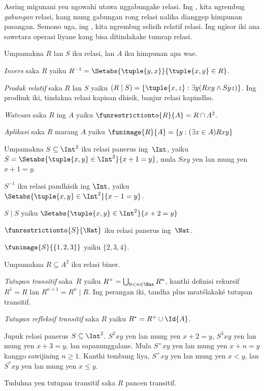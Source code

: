 \documentclass[../../../include/open-logic-section]{subfiles}
\begin{document}

Asring migunani yen ngowahi utawa nggabungake relasi.
Ing ,
kita ngrembug \emph{gabungan} relasi, kang mung
gabungan rong relasi nalika dianggep himpunan pasangan.
Semono uga, ing ,
kita ngrembug selisih relatif relasi.
Ing ngisor iki ana sawetara operasi liyane
kang bisa ditindakake tumrap relasi.

\begin{defn}
Umpamakna $R$ lan $S$ iku relasi, lan $A$ iku himpunan apa wae.

\emph{Invers} saka $R$ yaiku
$R^{-1} = \Setabs{\tuple{y, x}}{\tuple{x,y} \in R}$.

\emph{Produk relatif} saka $R$ lan $S$ yaiku
$(R \mid S) =\{\tuple{x, z} : \exists y(Rxy \land Syz)\}$.
Ing prodhuk iki, tindakna relasi kapisan dhisik, banjur relasi kapindho.

\emph{Watesan} saka $R$ ing $A$ yaiku
$\funrestrictionto{R}{A}= R\cap A^2$.

\emph{Aplikasi} saka $R$ marang $A$ yaiku
$\funimage{R}{A} = \{y :( \exists x \in A)Rxy\}$
\end{defn}

\begin{ex}
Umpamakna $S \subseteq \Int^2$ iku relasi panerus
ing~$\Int$, yaiku
$S = \Setabs{\tuple{x, y} \in \Int^2}{x + 1 = y}$,
mula $Sxy$ yen lan mung yen $x + 1 = y$.

$S^{-1}$ iku relasi pandhisik ing $\Int$, yaiku
$\Setabs{\tuple{x,y}\in\Int^2}{x -1 =y}$.

$S\mid S$ yaiku
$ \Setabs{\tuple{x,y}\in\Int^2}{x + 2 =y}$

$\funrestrictionto{S}{\Nat}$ iku relasi panerus ing~$\Nat$.

$\funimage{S}{\{1,2,3\}}$ yaiku $\{2, 3, 4\}$.
\end{ex}

\begin{defn}Umpamakna $R \subseteq A^2$ iku relasi biner.

\emph{Tutupan transitif} saka~$R$ yaiku
$R^+ = \bigcup_{0 < n \in\Nat} R^n$,
kanthi definisi rekursif $R^1 = R$ lan
$R^{n+1} = R^n\mid R$.
Ing perangan iki, tandha plus mratélakaké tutupan transitif.

\emph{Tutupan refleksif transitif} saka $R$ yaiku
$R^* = R^+ \cup\Id{A}$.
\end{defn}

\begin{ex}
Jupuk relasi panerus $S \subseteq \Int^2$.
$S^2xy$ yen lan mung yen $x + 2 =y$,
$S^3xy$ yen lan mung yen $x + 3 = y$,
lan sapanunggalane.
Mula $S^+xy$ yen lan mung yen $x + n = y$
kanggo sawijining $n \geq 1$.
Kanthi tembung liya, $S^+xy$ yen lan mung yen
$x < y$, lan $S^*xy$ yen lan mung yen $x \le y$.
\end{ex}

\begin{prob}
Tuduhna yen tutupan transitif saka $R$ pancen transitif.
\end{prob}
\end{document}
